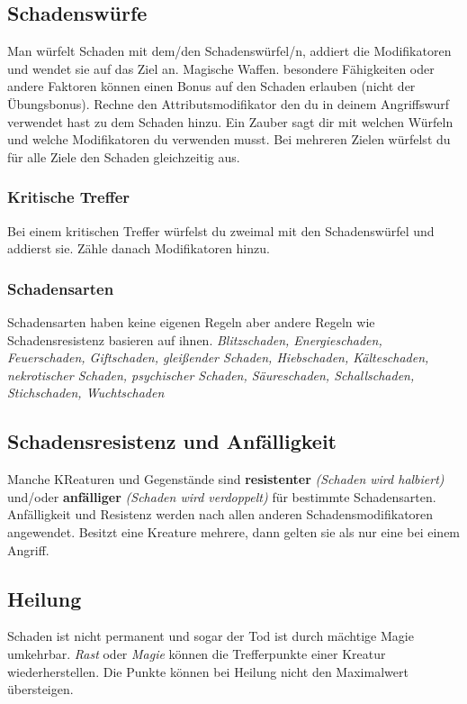 \subsection{Schadenswürfe}
Man würfelt Schaden mit dem/den Schadenswürfel/n, addiert die Modifikatoren und wendet sie auf das Ziel an. Magische Waffen. besondere Fähigkeiten oder andere Faktoren können einen Bonus auf den Schaden erlauben (nicht der Übungsbonus).
Rechne den Attributsmodifikator den du in deinem Angriffswurf verwendet hast zu dem Schaden hinzu. Ein Zauber sagt dir mit welchen Würfeln und welche Modifikatoren du verwenden musst. Bei mehreren Zielen würfelst du für alle Ziele den Schaden gleichzeitig aus.

\subsubsection{Kritische Treffer}
Bei einem kritischen Treffer würfelst du zweimal mit den Schadenswürfel und addierst sie. Zähle danach Modifikatoren hinzu.

\subsubsection{Schadensarten}
Schadensarten haben keine eigenen Regeln aber andere Regeln wie Schadensresistenz basieren auf ihnen.
\textit{Blitzschaden, Energieschaden, Feuerschaden, Giftschaden, gleißender Schaden, Hiebschaden, Kälteschaden, nekrotischer Schaden, psychischer Schaden, Säureschaden, Schallschaden, Stichschaden, Wuchtschaden}

\subsection{Schadensresistenz und Anfälligkeit}
Manche KReaturen und Gegenstände sind \textbf{resistenter} \textit{(Schaden wird halbiert)} und/oder \textbf{anfälliger} \textit{(Schaden wird verdoppelt)} für bestimmte Schadensarten.
Anfälligkeit und Resistenz werden nach allen anderen Schadensmodifikatoren angewendet. Besitzt eine Kreature mehrere, dann gelten sie als nur eine bei einem Angriff.

\subsection{Heilung}
Schaden ist nicht permanent und sogar der Tod ist durch mächtige Magie umkehrbar. \textit{Rast} oder \textit{Magie} können die Trefferpunkte einer Kreatur wiederherstellen. Die Punkte können bei Heilung nicht den Maximalwert übersteigen.


